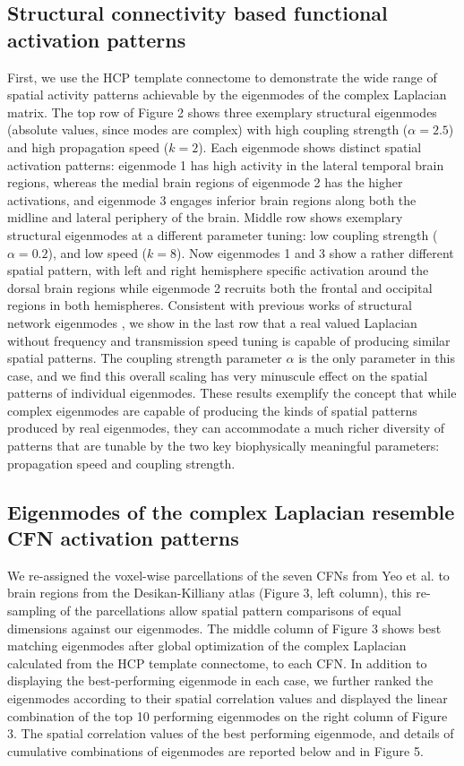 \documentclass{article}
\begin{document}
\subsection{Structural connectivity based functional activation patterns}
First, we use the HCP template connectome to demonstrate the wide range of spatial activity patterns achievable by the eigenmodes of the complex Laplacian matrix. The top row of Figure 2 shows three exemplary structural eigenmodes (absolute values, since modes are complex) with high coupling strength ($\alpha = 2.5$) and high propagation speed ($k = 2$). Each eigenmode shows distinct spatial activation patterns: eigenmode 1 has high activity in the lateral temporal brain regions, whereas the medial brain regions of eigenmode 2 has the higher activations, and eigenmode 3 engages inferior brain regions along both the midline and lateral periphery of the brain. Middle row shows exemplary structural eigenmodes at a different parameter tuning: low coupling strength ($\alpha = 0.2$), and low speed ($k = 8$). Now eigenmodes 1 and 3 show a rather different spatial pattern, with left and right hemisphere specific activation around the dorsal brain regions while eigenmode 2 recruits both the frontal and occipital regions in both hemispheres. Consistent with previous works of structural network eigenmodes \cite{Atasoy2016, Abdelnour2018}, we show in the last row that a real valued Laplacian without frequency and transmission speed tuning is capable of producing similar spatial patterns. The coupling strength parameter $\alpha$ is the only parameter in this case, and we find this overall scaling has very minuscule effect on the spatial patterns of individual eigenmodes. These results exemplify the concept that while complex eigenmodes are capable of producing the kinds of spatial patterns produced by real eigenmodes, they can accommodate a much richer diversity of patterns that are tunable by the two key biophysically meaningful parameters: propagation speed and coupling strength.

\subsection{Eigenmodes of the complex Laplacian resemble CFN activation patterns}
We re-assigned the voxel-wise parcellations of the seven CFNs from Yeo et al. \cite{Yeo2011} to brain regions from the Desikan-Killiany atlas (Figure 3, left column), this re-sampling of the parcellations allow spatial pattern comparisons of equal dimensions against our eigenmodes. The middle column of Figure 3 shows best matching eigenmodes after global optimization of the complex Laplacian calculated from the HCP template connectome, to each CFN. In addition to displaying the best-performing eigenmode in each case, we further ranked the eigenmodes according to their spatial correlation values and displayed the linear combination of the top 10 performing eigenmodes on the right column of Figure 3. The spatial correlation values of the best performing eigenmode, and details of cumulative combinations of eigenmodes are reported below and in Figure 5.
\end{document}
